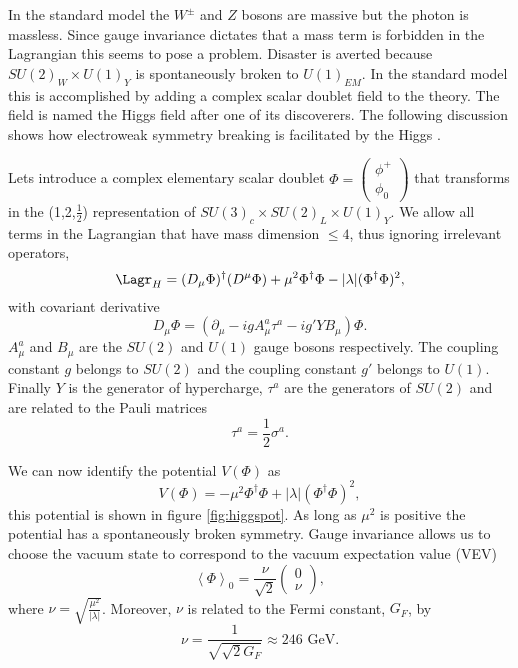 
In the standard model the $W^{\pm}$ and $Z$ bosons are massive but the photon is massless.
Since gauge invariance dictates that a mass term is forbidden in the Lagrangian this seems to pose a problem.
Disaster is averted because $SU(2)_W \times U(1)_Y$ is spontaneously broken to $U(1)_{EM}$.
In the standard model this is accomplished by adding a complex scalar doublet field to the theory.
The field is named the Higgs field after one of its discoverers.
The following discussion shows how electroweak symmetry breaking is facilitated by the Higgs \cite{ds 52, 53, peskin}.

Lets introduce a complex elementary scalar doublet $\Phi=\left(\begin{matrix}\phi^+\\\phi_0\end{matrix}\right)$ that transforms in the (1,2,$\frac{1}{2}$) representation of $SU(3)_c\times SU(2)_L\times U(1)_Y$.
We allow all terms in the Lagrangian that have mass dimension $\leq 4$, thus ignoring irrelevant operators,
\begin{equation}
  \Lagr_H=(D_\mu\Phi)^\dagger(D^\mu\Phi)+\mu^2\Phi^\dagger\Phi-|\lambda|(\Phi^\dagger\Phi)^2,
\end{equation}
with covariant derivative
\begin{equation}
  D_\mu\Phi=(\partial_\mu-igA^a_\mu\tau^a-ig'YB_\mu)\Phi.
\end{equation}
$A^a_\mu$ and $B_\mu$ are the $SU(2)$ and $U(1)$ gauge bosons respectively.
The coupling constant $g$ belongs to $SU(2)$ and the coupling constant $g'$ belongs to $U(1)$.
Finally $Y$ is the generator of hypercharge, $\tau^a$ are the generators of $SU(2)$ and are related to the Pauli matrices
\begin{equation}
  \tau^a=\frac{1}{2}\sigma^a.
\end{equation}

We can now identify the potential $V(\Phi)$ as
\begin{equation}
  V(\Phi)=-\mu^2\Phi^\dagger\Phi+|\lambda|(\Phi^\dagger\Phi)^2,
\end{equation}
this potential is shown in figure \ref{fig:higgspot}.
As long as $\mu^2$ is positive the potential has a spontaneously broken symmetry.
Gauge invariance allows us to choose the vacuum state to correspond to the vacuum expectation value (VEV)
\begin{equation}
  \left<\Phi\right>_0=\frac{\nu}{\sqrt{2}}\left(\begin{matrix}0 \\ \nu\end{matrix}\right),
\end{equation}
where $\nu=\sqrt{\frac{\mu^2}{|\lambda|}}$.
Moreover, $\nu$ is related to the Fermi constant, $G_F$, by
\begin{equation}
  \nu=\frac{1}{\sqrt{\sqrt{2}G_F}}\approx 246 \mbox{ GeV}.
\end{equation}

